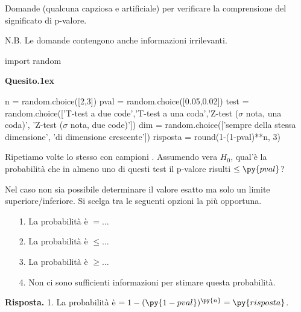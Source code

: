 \documentclass[11pt,twoside,a4paper]{article}
\newenvironment{question}{\bigskip\par\textbf{Quesito.\kern1ex}}{\vspace{\parskip}}
\newenvironment{answer}{\par\textbf{Risposta.\quad}}{}
\begin{document}
Domande (qualcuna capziosa e artificiale) per verificare la comprensione del significato di p-valore. 

N.B. Le domande contengono anche informazioni irrilevanti.

\begin{pycode}
import random
\end{pycode}

\begin{question}
\begin{pycode}
n = random.choice([2,3])
pval = random.choice([0.05,0.02])
test = random.choice(['T-test a due code','T-test a una coda','Z-test ($\sigma$ nota, una coda)', 'Z-test ($\sigma$ nota, due code)'])
dim  = random.choice(['sempre della stessa dimensione', 'di dimensione crescente'])
risposta = round(1-(1-pval)**n, 3)
\end{pycode}
Ripetiamo  volte lo stesso  con campioni .
Assumendo vera $H_0$, qual'è la probabilità che in almeno uno di questi test il p-valore risulti $\le\py{pval}$? 

Nel caso non sia possibile determinare il valore esatto ma solo un limite superiore/inferiore. Si scelga tra le seguenti opzioni la più opportuna.
\begin{itemize}
\item[1.] La probabilità è $=\dots$
\item[2.] La probabilità è $\le\dots$
\item[3.] La probabilità è $\ge\dots$
\item[4.] Non ci sono sufficienti informazioni per stimare questa probabilità.
\end{itemize}
\begin{answer}
1. La probabilità è $=1-(\py{1-pval})^{\py{n}}=\py{risposta}$.
\end{answer}
\end{question}
\end{document}
